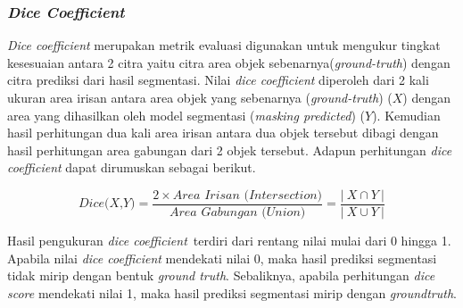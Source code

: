 \subsubsection{\textit{Dice Coefficient}}
\textit{Dice coefficient} merupakan metrik evaluasi digunakan untuk mengukur tingkat kesesuaian antara 2 citra yaitu citra area objek sebenarnya(\textit{ground-truth}) dengan citra prediksi dari hasil segmentasi. Nilai \textit{dice coefficient} diperoleh dari 2 kali ukuran area irisan antara area objek yang sebenarnya (\textit{ground-truth}) ($X$) dengan area yang dihasilkan oleh model segmentasi (\textit{masking predicted}) ($Y$). Kemudian hasil perhitungan dua kali area irisan antara dua objek tersebut dibagi dengan hasil perhitungan area gabungan dari 2 objek tersebut. Adapun perhitungan \textit{dice coefficient} dapat dirumuskan sebagai berikut. 

\begin{equation}
	\textit{Dice(X,Y)} = \frac{2 \times \textit{Area Irisan (Intersection)}}{\textit{Area Gabungan (Union)}} = \frac{|\ X \cap Y\ |}{|\ X \cup Y\ |}
\end{equation}

Hasil pengukuran \textit{dice coefficient} terdiri dari rentang nilai mulai dari 0 hingga 1. Apabila nilai \textit{dice coefficient} mendekati nilai 0, maka hasil prediksi segmentasi tidak mirip dengan bentuk \textit{ground truth}. Sebaliknya, apabila perhitungan \textit{dice score} mendekati nilai 1, maka hasil prediksi segmentasi mirip dengan \textit{groundtruth}.

